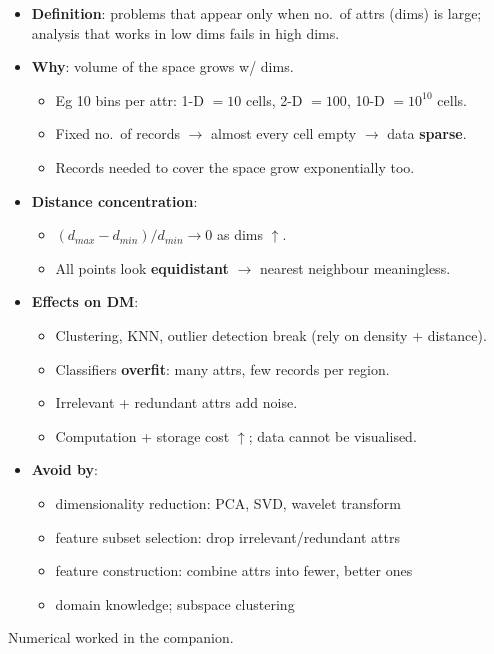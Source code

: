{\begin{itemize}
  \item \textbf{Definition}: problems that appear only when no.\ of attrs (dims) is large;
        analysis that works in low dims fails in high dims.
  \item \textbf{Why}: volume of the space grows  w/ dims.
  \begin{itemize}
    \item Eg 10 bins per attr: 1-D $=10$ cells, 2-D $=100$, 10-D $=10^{10}$ cells.
    \item Fixed no.\ of records $\rightarrow$ almost every cell empty $\rightarrow$ data \textbf{sparse}.
    \item Records needed to cover the space grow exponentially too.
  \end{itemize}
  \item \textbf{Distance concentration}:
  \begin{itemize}
    \item $(d_{max}-d_{min})/d_{min} \rightarrow 0$ as dims $\uparrow$.
    \item All points look \textbf{equidistant} $\rightarrow$ nearest neighbour meaningless.
  \end{itemize}
  \item \textbf{Effects on DM}:
  \begin{itemize}
    \item Clustering, KNN, outlier detection break (rely on density + distance).
    \item Classifiers \textbf{overfit}: many attrs, few records per region.
    \item Irrelevant + redundant attrs add noise.
    \item Computation + storage cost $\uparrow$; data cannot be visualised.
  \end{itemize}
  \item \textbf{Avoid by}:
  \begin{itemize}
    \item dimensionality reduction: PCA, SVD, wavelet transform
    \item feature subset selection: drop irrelevant/redundant attrs
    \item feature construction: combine attrs into fewer, better ones
    \item domain knowledge; subspace clustering
  \end{itemize}
\end{itemize}}

{\color{sub}\footnotesize {} \gap Numerical worked in the companion.}

